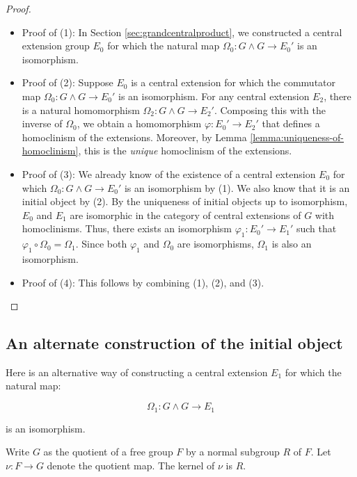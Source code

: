 \begin{proof}
  \begin{itemize}
  \item Proof of (1): In Section \ref{sec:grandcentralproduct}, we
    constructed a central extension group $E_0$ for which the natural
    map $\Omega_0: G \wedge G \to E_0'$ is an isomorphism.

  \item Proof of (2): Suppose $E_0$ is a central extension for which
    the commutator map $\Omega_0:G \wedge G \to E_0'$ is an
    isomorphism. For any central extension $E_2$, there is a natural
    homomorphism $\Omega_2: G \wedge G \to E_2'$. Composing this with
    the inverse of $\Omega_0$, we obtain a homomorphism
    $\varphi:E_0' \to E_2'$ that defines a homoclinism of the
    extensions. Moreover, by Lemma
    \ref{lemma:uniqueness-of-homoclinism}, this is the {\em unique}
    homoclinism of the extensions.

  \item Proof of (3): We already know of the existence of a central
    extension $E_0$ for which $\Omega_0:G \wedge G \to E_0'$ is
    an isomorphism by (1). We also know that it is an initial object
    by (2). By the uniqueness of initial objects up to isomorphism,
    $E_0$ and $E_1$ are isomorphic in the category of central
    extensions of $G$ with homoclinisms. Thus, there exists an
    isomorphism $\varphi_1:E_0' \to E_1'$ such that $\varphi_1 \circ
    \Omega_0 = \Omega_1$. Since both $\varphi_1$ and $\Omega_0$ are
    isomorphisms, $\Omega_1$ is also an isomorphism.

  \item Proof of (4): This follows by combining (1), (2), and (3).
  \end{itemize}
\end{proof}

\subsection{An alternate construction of the initial object}\label{sec:freeinitialobject}

Here is an alternative way of constructing a central extension $E_1$ for which the natural map:

$$\Omega_1:G \wedge G \to E_1$$

is an isomorphism.

Write $G$ as the quotient of a free group $F$ by a normal subgroup $R$
of $F$. Let $\nu:F \to G$ denote the quotient map. The kernel of $\nu$
is $R$.

